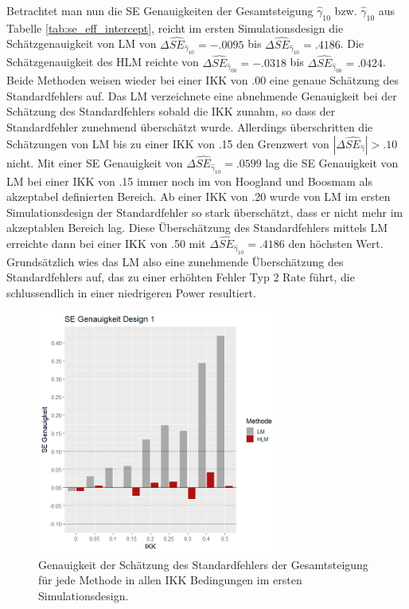 \documentclass[12pt]{article}\usepackage[]{graphicx}\usepackage[]{color}
\begin{document}
Betrachtet man nun die SE Genauigkeiten der Gesamtsteigung $\widehat{\gamma}_{10}$ bzw. $\widehat{\gamma}_{10}$ aus Tabelle \ref{tab:se_eff_intercept}, reicht im ersten Simulationsdesign die Schätzgenauigkeit von LM von $\Delta\widehat{SE}_{\widehat{\gamma}_{10}} = -.0095$ bis $\Delta\widehat{SE}_{\widehat{\gamma}_{10}} = .4186$. Die Schätzgenauigkeit des HLM reichte von $\Delta\widehat{SE}_{\widehat{\gamma}_{00}} = -.0318$ bis $\Delta\widehat{SE}_{\widehat{\gamma}_{00}} = .0424$. Beide Methoden weisen wieder bei einer IKK von .00 eine genaue Schätzung des Standardfehlers auf. Das LM verzeichnete eine abnehmende Genauigkeit bei der Schätzung des Standardfehlers sobald die IKK zunahm, so dass der Standardfehler zunehmend überschätzt wurde. Allerdings überschritten die Schätzungen von LM bis zu einer IKK von .15 den Grenzwert von $|\Delta\widehat{SE}_{\widehat{\gamma}}| > .10$ nicht. Mit einer SE Genauigkeit von $\Delta\widehat{SE}_{\widehat{\gamma}_{10}} = .0599$ lag die SE Genauigkeit von LM bei einer IKK von .15 immer noch im von Hoogland und Boosmam \citeyearpar{hooglandboosma1998robustness} als akzeptabel definierten Bereich. Ab einer IKK von .20 wurde von LM im ersten Simulationsdesign der Standardfehler so stark überschätzt, dass er nicht mehr im akzeptablen Bereich lag. Diese Überschätzung des Standardfehlers mittels LM erreichte dann bei einer IKK von .50 mit $\Delta\widehat{SE}_{\widehat{\gamma}_{10}} = .4186$ den höchsten Wert. Grundsätzlich wies das LM also eine zunehmende Überschätzung des Standardfehlers auf, das zu einer erhöhten Fehler Typ 2 Rate führt, die schlussendlich in einer niedrigeren Power resultiert. 
\begin{figure}[t!]
\centering
\captionsetup{width=8cm}
\includegraphics[width=8cm, height=8cm]{se_genauigkeit_design1}
\caption{Genauigkeit der Schätzung des Standardfehlers der Gesamtsteigung für jede Methode in allen IKK Bedingungen im ersten Simulationsdesign.}
\label{fig:se_genauigkeit_design1}
\end{figure}
\end{document}
